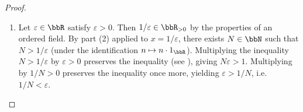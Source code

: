 \begin{proof}
\begin{enumerate}
        \item Let $\varepsilon \in \bbR$ satisfy $\varepsilon > 0$. Then $1/\varepsilon \in \bbR_{>0}$ by the properties of an ordered field.
        By part (2) applied to $x = 1/\varepsilon$, there exists $N \in \bbN$ such that $N > 1/\varepsilon$ (under the identification $n \mapsto n \cdot 1_\bbR$). Multiplying the inequality $N > 1/\varepsilon$ by $\varepsilon > 0$ preserves the inequality (see ), giving $N\varepsilon > 1$. Multiplying by $1/N > 0$ preserves the inequality once more, yielding $\varepsilon > 1/N$, i.e.\ $1/N < \varepsilon$.
    \end{enumerate}
\end{proof}
